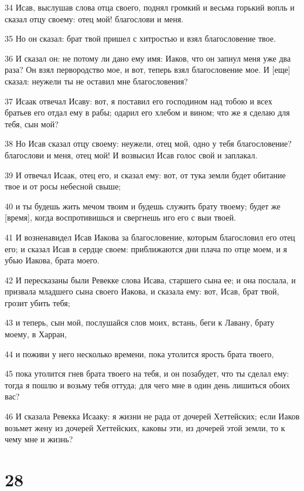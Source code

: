 \par 34 Исав, выслушав слова отца своего, поднял громкий и весьма горький вопль и сказал отцу своему: отец мой! благослови и меня.
\par 35 Но он сказал: брат твой пришел с хитростью и взял благословение твое.
\par 36 И сказал он: не потому ли дано ему имя: Иаков, что он запнул меня уже два раза? Он взял первородство мое, и вот, теперь взял благословение мое. И [еще] сказал: неужели ты не оставил мне благословения?
\par 37 Исаак отвечал Исаву: вот, я поставил его господином над тобою и всех братьев его отдал ему в рабы; одарил его хлебом и вином; что же я сделаю для тебя, сын мой?
\par 38 Но Исав сказал отцу своему: неужели, отец мой, одно у тебя благословение? благослови и меня, отец мой! И возвысил Исав голос свой и заплакал.
\par 39 И отвечал Исаак, отец его, и сказал ему: вот, от тука земли будет обитание твое и от росы небесной свыше;
\par 40 и ты будешь жить мечом твоим и будешь служить брату твоему; будет же [время], когда воспротивишься и свергнешь иго его с выи твоей.
\par 41 И возненавидел Исав Иакова за благословение, которым благословил его отец его; и сказал Исав в сердце своем: приближаются дни плача по отце моем, и я убью Иакова, брата моего.
\par 42 И пересказаны были Ревекке слова Исава, старшего сына ее; и она послала, и призвала младшего сына своего Иакова, и сказала ему: вот, Исав, брат твой, грозит убить тебя;
\par 43 и теперь, сын мой, послушайся слов моих, встань, беги к Лавану, брату моему, в Харран,
\par 44 и поживи у него несколько времени, пока утолится ярость брата твоего,
\par 45 пока утолится гнев брата твоего на тебя, и он позабудет, что ты сделал ему: тогда я пошлю и возьму тебя оттуда; для чего мне в один день лишиться обоих вас?
\par 46 И сказала Ревекка Исааку: я жизни не рада от дочерей Хеттейских; если Иаков возьмет жену из дочерей Хеттейских, каковы эти, из дочерей этой земли, то к чему мне и жизнь?

\chapter{28}

